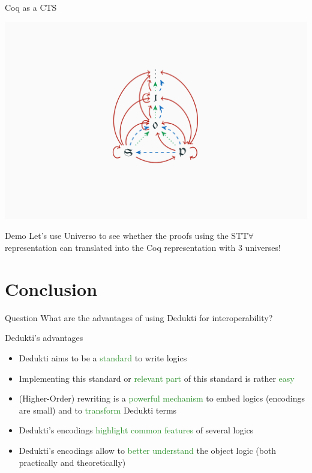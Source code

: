 \documentclass[usenames, dvipsnames]{beamer}
\newcommand{\green}[1]{\textcolor{ForestGreen}{#1}}
\newcommand{\orange}[1]{\textcolor{BurntOrange}{#1}}
\begin{document}
\begin{frame}{Coq as a CTS}
  \begin{center}    
    \includegraphics[scale=0.2]{images/coq_cts.png}
  \end{center}    
\end{frame}

\begin{frame}{Demo}
  \large{Let's use Universo to see whether the proofs using the
    STT\(\forall\) representation can translated into the Coq
    representation with \(3\) universes!}
\end{frame}

\section{Conclusion}

\begin{frame}
  \begin{block}{Question}
    \Large{What are the advantages of using Dedukti for \orange{interoperability}?}
  \end{block}
\end{frame}

\begin{frame}{Dedukti's advantages}
  \begin{itemize}
  \item Dedukti aims to be a \green{standard} to write logics
  \item Implementing this standard or \green{relevant part} of this
    standard is rather \green{easy}
  \item (Higher-Order) rewriting is a \green{powerful mechanism} to
    embed logics (encodings are small) and to \green{transform}
    Dedukti terms
  \item Dedukti's encodings \green{highlight common features} of
    several logics
  \item Dedukti's encodings allow to \green{better understand} the
    object logic (both practically and theoretically)
  \end{itemize}
\end{frame}
\end{document}
